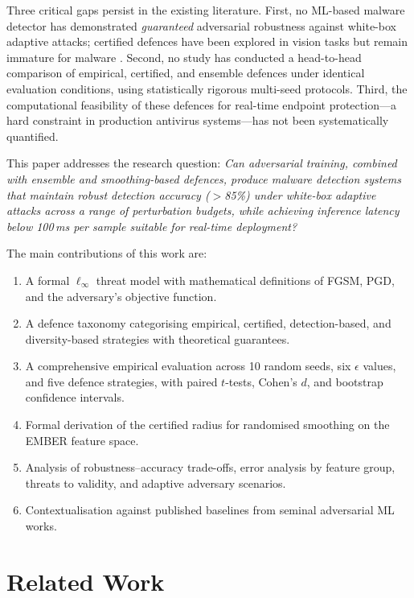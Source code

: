 \documentclass[conference]{IEEEtran}
\begin{document}
Three critical gaps persist in the existing literature. First, no ML-based malware detector has demonstrated \emph{guaranteed} adversarial robustness against white-box adaptive attacks; certified defences have been explored in vision tasks \cite{cohen2019,wongkolter2018} but remain immature for malware \cite{gibert2024}. Second, no study has conducted a head-to-head comparison of empirical, certified, and ensemble defences under identical evaluation conditions, using statistically rigorous multi-seed protocols. Third, the computational feasibility of these defences for real-time endpoint protection---a hard constraint in production antivirus systems---has not been systematically quantified.

This paper addresses the research question: \textit{Can adversarial training, combined with ensemble and smoothing-based defences, produce malware detection systems that maintain robust detection accuracy ($>$85\%) under white-box adaptive attacks across a range of perturbation budgets, while achieving inference latency below 100\,ms per sample suitable for real-time deployment?}

The main contributions of this work are:
\begin{enumerate}
\item A formal $\ell_\infty$ threat model with mathematical definitions of FGSM, PGD, and the adversary's objective function.
\item A defence taxonomy categorising empirical, certified, detection-based, and diversity-based strategies with theoretical guarantees.
\item A comprehensive empirical evaluation across 10 random seeds, six $\epsilon$ values, and five defence strategies, with paired $t$-tests, Cohen's $d$, and bootstrap confidence intervals.
\item Formal derivation of the certified radius for randomised smoothing on the EMBER feature space.
\item Analysis of robustness--accuracy trade-offs, error analysis by feature group, threats to validity, and adaptive adversary scenarios.
\item Contextualisation against published baselines from seminal adversarial ML works.
\end{enumerate}

\section{Related Work}
\end{document}
